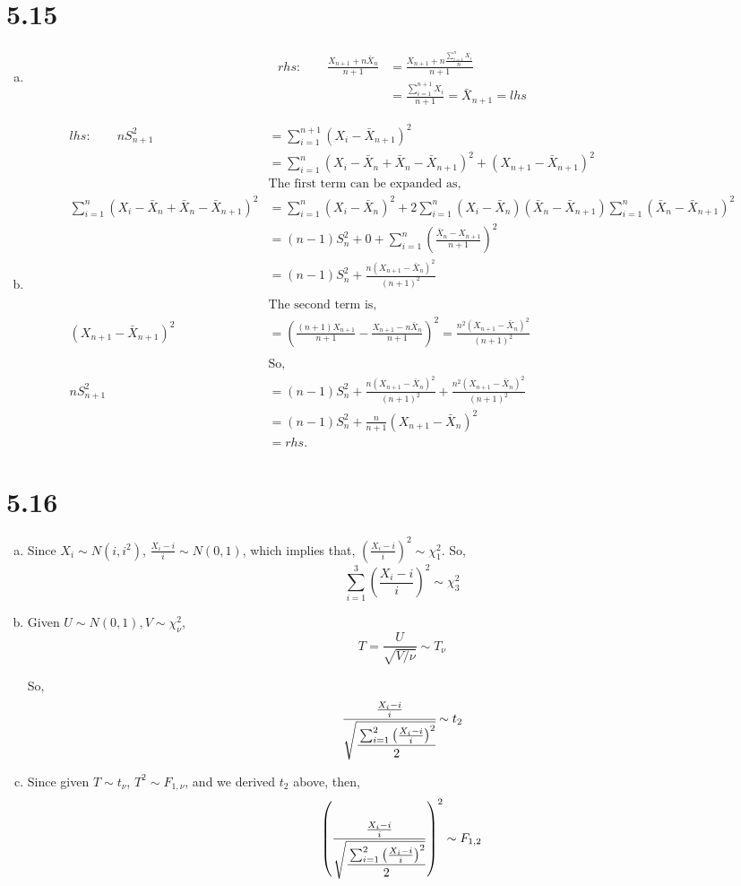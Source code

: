 \documentclass[letterpaper]{article}
\begin{document}
\section*{5.15}
\begin{enumerate}[(a)]
\item
\begin{align*}
rhs: \qquad \frac{X_{n+1} + n \bar X_n}{n+1} & = \frac{X_{n+1} + n \frac{\sum_{i=1}^n X_i}{n}}{n+1} \\
& = \frac{\sum_{i=1}^{n+1} X_i}{n+1} = \bar X_{n+1} = lhs
\end{align*}
\item 
\begin{align*}
lhs: \qquad n S_{n+1}^2 & = \sum_{i=1}^{n+1} (X_i - \bar X_{n+1})^2 \\
& = \sum_{i=1}^n (X_i - \bar X_n + \bar X_n - \bar X_{n+1})^2 + (X_{n+1} - \bar X_{n+1})^2
\\
& \text{The first term can be expanded as},\\
\sum_{i=1}^n (X_i - \bar X_n + \bar X_n - \bar X_{n+1})^2 & = \sum_{i=1}^n (X_i - \bar X_n)^2 + 2 \sum_{i=1}^n (X_i - \bar X_n)(\bar X_n - \bar X_{n+1}) \sum_{i=1}^n (\bar X_n - \bar X_{n+1})^2 \\
& = (n-1)S_n^2 + 0 + \sum_{i=1}^n \left(\frac{\bar X_n - X_{n+1}}{n+1}\right)^2 \\
& = (n-1)S_n^2 + \frac{n(X_{n+1} - \bar X_n)^2}{(n+1)^2} \\
\\
& \text{The second term is},\\
(X_{n+1} - \bar X_{n+1})^2 & = \left(\frac{(n+1) X_{n+1}}{n+1} - \frac{X_{n+1} - n \bar X_n}{n+1}\right)^2 = \frac{n^2(X_{n+1} - \bar X_n)^2}{(n+1)^2} \\
\\
& \text{So,}\\
nS_{n+1}^2 & = (n-1)S_n^2 + \frac{n(X_{n+1} - \bar X_n)^2}{(n+1)^2} + \frac{n^2(X_{n+1} - \bar X_n)^2}{(n+1)^2} \\
& = (n-1)S_n^2 + \frac{n}{n+1}(X_{n+1} - \bar X_n)^2 \\
& = rhs.
\end{align*}
\end{enumerate}
\section*{5.16}
\begin{enumerate}[(a)]
\item Since $X_i \sim N(i, i^2)$, $\frac{X_i - i}{i} \sim N(0, 1)$, which implies that, $\left(\frac{X_i - i}{i}\right)^2 \sim \chi_1^2$.
So,
\[
\sum_{i=1}^3 \left(\frac{X_i - i}{i}\right)^2 \sim \chi_3^2
\]
\item
Given $U \sim N(0, 1), V \sim \chi^2_\nu$, 
\[
T = \frac{U}{\sqrt{V/\nu}} \sim T_\nu
\]

So, 
\[
\cfrac{\frac{X_i - i}{i}}{\sqrt{\cfrac{\sum_{i=1}^2 \left(\frac{X_i-i}{i} \right)^2}{2}}} \sim t_2
\]
\item Since given $T \sim t_\nu$, $T^2 \sim F_{1, \nu}$, and we derived $t_2$ above, then,
\[
\left(\frac{\frac{X_i - i}{i}}{\sqrt{\cfrac{\sum_{i=1}^2 \left(\frac{X_i-i}{i} \right)^2}{2}}}\right)^2 \sim F_{1,2}
\]
\end{enumerate}
\end{document}
